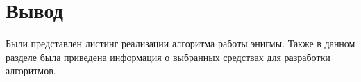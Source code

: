 \section*{Вывод}

Были представлен листинг реализации алгоритма работы энигмы. Также в данном разделе была приведена информация о выбранных средствах для разработки алгоритмов.
